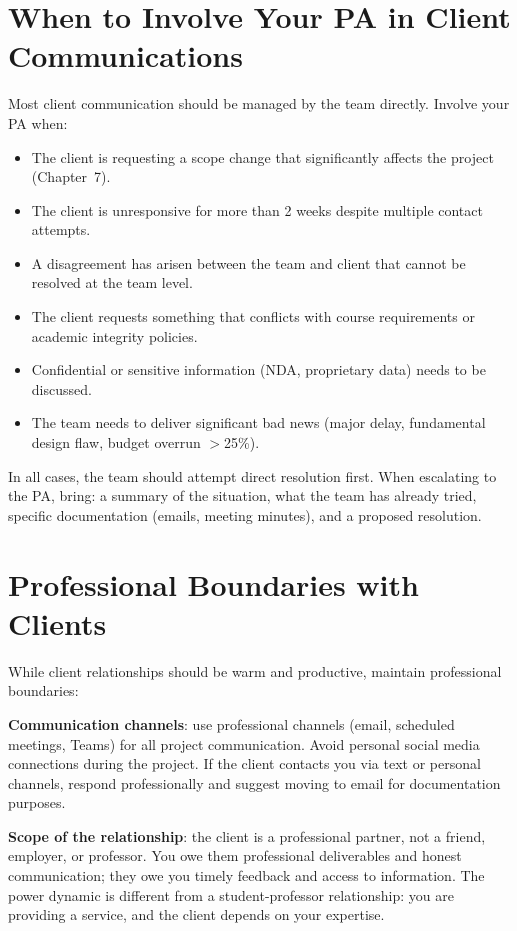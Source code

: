 \section{When to Involve Your PA in Client Communications}
Most client communication should be managed by the team directly. Involve your PA when:

\begin{itemize}[nosep,leftmargin=1.5em]
\item The client is requesting a scope change that significantly affects the project (Chapter~7).
\item The client is unresponsive for more than 2 weeks despite multiple contact attempts.
\item A disagreement has arisen between the team and client that cannot be resolved at the team level.
\item The client requests something that conflicts with course requirements or academic integrity policies.
\item Confidential or sensitive information (NDA, proprietary data) needs to be discussed.
\item The team needs to deliver significant bad news (major delay, fundamental design flaw, budget overrun $>$25\%).
\end{itemize}

In all cases, the team should attempt direct resolution first. When escalating to the PA, bring: a summary of the situation, what the team has already tried, specific documentation (emails, meeting minutes), and a proposed resolution.



\section{Professional Boundaries with Clients}
While client relationships should be warm and productive, maintain professional boundaries:

\textbf{Communication channels}: use professional channels (email, scheduled meetings, Teams) for all project communication. Avoid personal social media connections during the project. If the client contacts you via text or personal channels, respond professionally and suggest moving to email for documentation purposes.

\textbf{Scope of the relationship}: the client is a professional partner, not a friend, employer, or professor. You owe them professional deliverables and honest communication; they owe you timely feedback and access to information. The power dynamic is different from a student-professor relationship: you are providing a service, and the client depends on your expertise.

